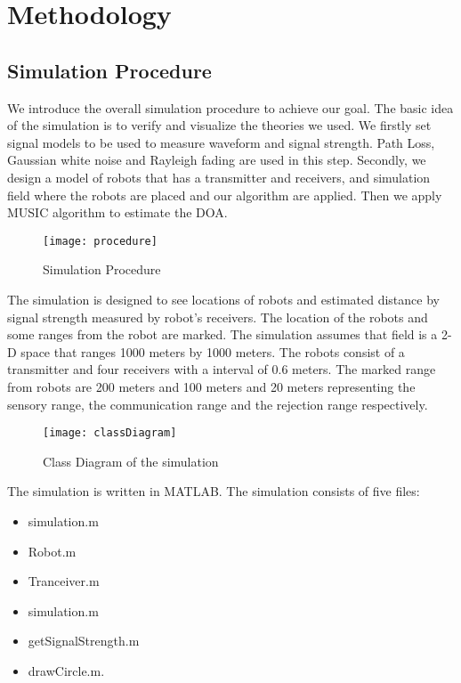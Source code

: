 \section{Methodology}
\subsection{Simulation Procedure}
We introduce the overall simulation procedure to achieve our goal. The basic idea of the simulation is to verify and visualize the theories we used. We firstly set signal models to be used to measure waveform and signal strength. Path Loss, Gaussian white noise and Rayleigh fading are used in this step. Secondly, we design a model of robots that has a transmitter and receivers, and simulation field where the robots are placed and our algorithm are applied. Then we apply MUSIC algorithm to estimate the DOA.


\begin{figure}[ht]
	\centering
	\texttt{[image: procedure]}
	\caption{Simulation Procedure}
	\end{figure}
	
The simulation is designed to see locations of robots and estimated distance by signal strength measured by robot's receivers. The location of the robots and some ranges from the robot are marked. The simulation assumes that field is a 2-D space that ranges 1000 meters by 1000 meters. The robots consist of a transmitter and four receivers with a interval of 0.6 meters. The marked range from robots are 200 meters and 100 meters and 20 meters representing the sensory range, the communication range and the rejection range respectively.



\begin{figure}[ht]
	\centering
	\texttt{[image: classDiagram]}
	\caption{Class Diagram of the simulation}
	\end{figure}
	

The simulation is written in MATLAB. The simulation consists of five files: 
\begin{itemize}
	\item simulation.m
	\item Robot.m
	\item Tranceiver.m
	\item simulation.m
	\item getSignalStrength.m
	\item drawCircle.m.
\end{itemize}

